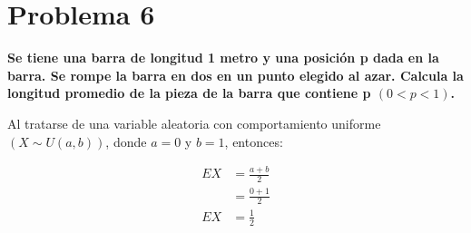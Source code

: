 \section*{Problema 6}

\textbf{Se tiene una barra de longitud 1 metro y una posición p dada en la barra. Se rompe la barra en dos en un punto elegido al azar. Calcula la longitud promedio de la pieza de la barra que contiene p $(0 < p < 1)$.}

Al tratarse de una variable aleatoria con comportamiento uniforme $(X\sim U(a,b))$, donde $a=0$ y $b=1$, entonces:

\begin{align*}
    EX & = \frac{a+b}{2} \\
       & = \frac{0+1}{2} \\
    EX & = \frac{1}{2}
\end{align*}
